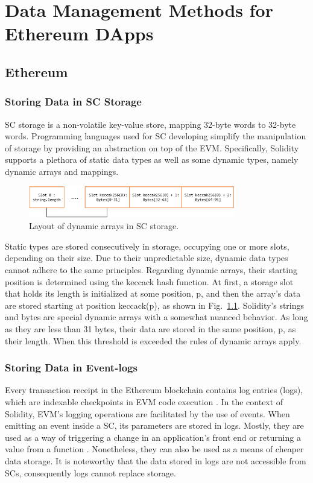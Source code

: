 \chapter{Data Management Methods for Ethereum DApps}\label{chapter:data_management}

\section{Ethereum}\label{sec:}


\subsection{Storing Data in SC Storage}\label{subsection:}
SC storage is a non-volatile key-value store, mapping 32-byte words to 32-byte words. Programming languages used for SC developing simplify the manipulation of storage by providing an abstraction on top of the EVM. Specifically, Solidity supports a plethora of static data types as well as some dynamic types, namely dynamic arrays and mappings.

\begin{figure}[htbp]
\centerline{\includegraphics[width=9cm]{figs/Storage.pdf}}
\caption{Layout of dynamic arrays in SC storage.}
\label{fig:arrays}
\end{figure}

Static types are stored consecutively in storage, occupying one or more slots, depending on their size. Due to their unpredictable size, dynamic data types cannot adhere to the same principles. Regarding dynamic arrays, their starting position is determined using the keccack hash function. At first, a storage slot that holds its length is initialized at some position, p, and then the array’s data are stored starting at position keccack(p), as shown in Fig.~\ref{fig:arrays}. Solidity’s strings and bytes are special dynamic arrays with a somewhat nuanced behavior. As long as they are less than 31 bytes, their data are stored in the same position, p, as their length. When this threshold is exceeded the rules of dynamic arrays apply.

\subsection{Storing Data in Event-logs}\label{subsection:}
Every transaction receipt in the Ethereum blockchain contains log entries (logs), which are indexable checkpoints in EVM code execution  \citep{wood_2014}. In the context of Solidity, EVM’s logging operations are facilitated by the use of events. When emitting an event inside a SC, its parameters are stored in logs. Mostly, they are used as a way of triggering a change in an application’s front end or returning a value from a function  \citep{consensys}. Nonetheless, they can also be used as a means of cheaper data storage. It is noteworthy that the data stored in logs are not accessible from SCs, consequently logs cannot replace storage.

